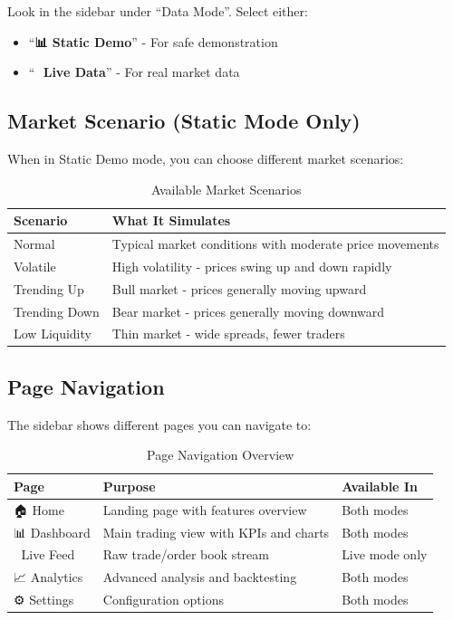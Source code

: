 \documentclass[12pt,a4paper]{article}
\begin{document}
\begin{importantbox}
Look in the sidebar under ``Data Mode''. Select either:
\begin{itemize}
    \item ``\textbf{📊 Static Demo}'' - For safe demonstration
    \item ``\textbf{📡 Live Data}'' - For real market data
\end{itemize}
\end{importantbox}

\subsection{Market Scenario (Static Mode Only)}

When in Static Demo mode, you can choose different market scenarios:

\begin{table}[h]
\centering
\begin{tabular}{lp{10cm}}
\toprule
\textbf{Scenario} & \textbf{What It Simulates} \\
\midrule
Normal & Typical market conditions with moderate price movements \\
Volatile & High volatility - prices swing up and down rapidly \\
Trending Up & Bull market - prices generally moving upward \\
Trending Down & Bear market - prices generally moving downward \\
Low Liquidity & Thin market - wide spreads, fewer traders \\
\bottomrule
\end{tabular}
\caption{Available Market Scenarios}
\end{table}

\subsection{Page Navigation}

The sidebar shows different pages you can navigate to:

\begin{table}[h]
\centering
\begin{tabular}{lp{8cm}l}
\toprule
\textbf{Page} & \textbf{Purpose} & \textbf{Available In} \\
\midrule
🏠 Home & Landing page with features overview & Both modes \\
📊 Dashboard & Main trading view with KPIs and charts & Both modes \\
📡 Live Feed & Raw trade/order book stream & Live mode only \\
📈 Analytics & Advanced analysis and backtesting & Both modes \\
⚙️ Settings & Configuration options & Both modes \\
\bottomrule
\end{tabular}
\caption{Page Navigation Overview}
\end{table}
\end{document}

